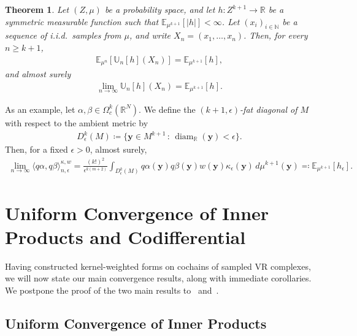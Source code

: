 \documentclass[11pt,reqno]{amsproc}
\numberwithin{equation}{section}
\newcommand{\N}{\mathbb{N}}
\newcommand{\R}{\mathbb{R}}
\newcommand{\E}{\mathbb{E}}
\newcommand{\U}{\mathbb{U}}
\newcommand{\by}{\mathbf{y}}
\newcommand{\diam}{\operatorname{diam}}
\newtheorem{theorem}[counter]{Theorem}
\theoremstyle{definition}
\theoremstyle{plain}
\begin{document}
    \begin{theorem}{\cite[Section 5.4, Theorem A]{serfling_approximation_1980}} \label{thm:ustat_slln}
        Let $(Z, \mu)$ be a probability space, and let $h : Z^{k+1} \to \R$ be a symmetric measurable function such that $\E_{\mu^{k+1}}[|h|] < \infty$. Let $(x_i)_{i\in\N}$ be a sequence of i.i.d.~samples from $\mu$, and write $X_n=(x_1,\ldots,x_n)$. Then, for every $n\geq k+1$,
        \begin{align}
            \E_{\mu^n}[\U_n[h](X_n)]=\E_{\mu^{k+1}}[h],
        \end{align}
        and almost surely
        \begin{align}
            \lim_{n \to \infty} \U_n[h](X_n) = \E_{\mu^{k+1}}[h].
        \end{align}
    \end{theorem}

    As an example, let $\alpha, \beta \in \Omega^k_c(\R^N)$. We define the \emph{$(k+1,\epsilon)$-fat diagonal of $M$} with respect to the ambient metric by
    \begin{align} \label{eq:fat_diagonal}
        D^k_\epsilon(M) \coloneqq \{\by \in M^{k+1} \, : \, \diam_\R(\by) < \epsilon\}.
    \end{align}
    Then, for a fixed $\epsilon > 0$, almost surely,
    \begin{align} \label{eq:base_inner_prod_limit}
        \lim_{n \to \infty} \langle q \alpha, q\beta\rangle_{n,\epsilon}^{\kappa,w} = \frac{(k!)^2}{\epsilon^{k(m+2)}} \int_{D^k_\epsilon(M)} q\alpha(\by) q\beta(\by) w(\by) \kappa_\epsilon(\by)\, d\mu^{k+1}(\by) \eqqcolon \E_{\mu^{k+1}}[h_\epsilon].
    \end{align}



    \section{Uniform Convergence of Inner Products and Codifferential} \label{sec:main_results}

    Having constructed kernel-weighted forms on cochains of sampled VR complexes, we will now state our main convergence results, along with immediate corollaries. We postpone the proof of the two main results to~ and~.


    \subsection{Uniform Convergence of Inner Products}
\end{document}
